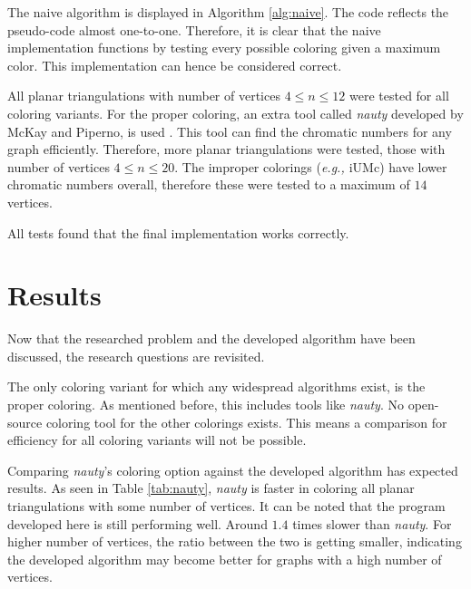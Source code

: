 \documentclass{article}
\begin{document}
The naive algorithm is displayed in Algorithm \ref{alg:naive}. The code reflects the pseudo-code almost one-to-one. Therefore, it is clear that the naive implementation functions by testing every possible coloring given a maximum color. This implementation can hence be considered correct.

All planar triangulations with number of vertices $4 \le n \le 12$ were tested for all coloring variants. 
For the proper coloring, an extra tool called \textit{nauty} developed by McKay and Piperno, is used \cite{mckay2014practical}. This tool can find the chromatic numbers for any graph efficiently. Therefore, more planar triangulations were tested, those with number of vertices $4 \le n \le 20$.
The improper colorings (\textit{e.g., $\mathrm{iUMc}$}) have lower chromatic numbers overall, therefore these were tested to a maximum of $14$ vertices.

All tests found that the final implementation works correctly.

\section{Results}
\label{sec:results}

Now that the researched problem and the developed algorithm have been discussed, the research questions are revisited. 

The only coloring variant for which any widespread algorithms exist, is the proper coloring. As mentioned before, this includes tools like \textit{nauty}. No open-source coloring tool for the other colorings exists. This means a comparison for efficiency for all coloring variants will not be possible.

Comparing \textit{nauty}'s coloring option against the developed algorithm has expected results. As seen in Table \ref{tab:nauty}, \textit{nauty} is faster in coloring all planar triangulations with some number of vertices. It can be noted that the program developed here is still performing well. Around $1.4$ times slower than \textit{nauty}. For higher number of vertices, the ratio between the two is getting smaller, indicating the developed algorithm may become better for graphs with a high number of vertices.
\end{document}
